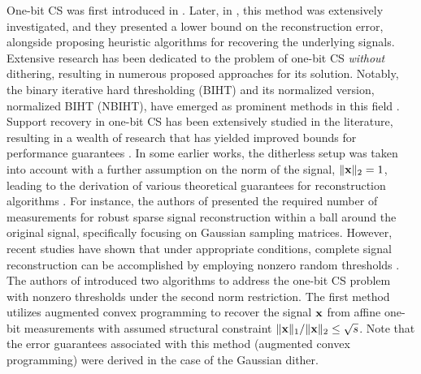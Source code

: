 \documentclass[12pt,draftcls,onecolumn]{IEEEtran}
\begin{document}
One-bit CS was first introduced in \cite{boufounos20081}. Later, in \cite{jacques2013robust}, this method was extensively investigated, and they presented a lower bound on the reconstruction error, alongside proposing heuristic algorithms for recovering the underlying signals. Extensive research has been dedicated to the problem of one-bit CS \emph{without} dithering, resulting in numerous proposed approaches for its solution. Notably, the binary iterative hard thresholding (BIHT) and its normalized version, normalized BIHT (NBIHT), have emerged as prominent methods in this field \cite{boufounos20081,boufounos2015quantization,bahmani2013robust,plan2013one,jacques2013quantized,jacques2013robust,friedlander2021nbiht,matsumoto2022binary}. %
Support recovery in one-bit CS has been extensively studied in the literature, resulting in a wealth of research that has yielded improved bounds for performance guarantees \cite{haupt2011robust,acharya2017improved,flodin2019superset}.
In some earlier works, the ditherless setup was taken into account with a further assumption on the norm of the signal, $\|\mathbf{x}\|_{2}=1$, leading to the derivation of various theoretical guarantees for reconstruction algorithms \cite{jacques2013robust,ai2014one,shi2016methods,friedlander2021nbiht,liu2019one}. For instance, %
the authors of \cite{jacques2013robust} presented the required number of measurements for robust sparse signal reconstruction within a ball %
around the original signal, specifically focusing on Gaussian sampling matrices. However, %
recent studies have shown that under appropriate conditions, complete signal reconstruction can be accomplished by employing nonzero random thresholds \cite{knudson2016one,baraniuk2017exponential,dirksen2021non,xu2020quantized}.
The authors of \cite{knudson2016one} introduced two algorithms to address the one-bit CS problem with nonzero thresholds
under the second norm restriction. 
The first method utilizes augmented convex programming to recover the signal $\mathbf{x}$ from affine one-bit measurements with assumed structural constraint $\|\mathbf{x}\|_1 /\|\mathbf{x}\|_2 \leq \sqrt{s}$. Note that the error guarantees associated with this method (augmented convex programming) were derived in the case of the Gaussian dither.
\end{document}
